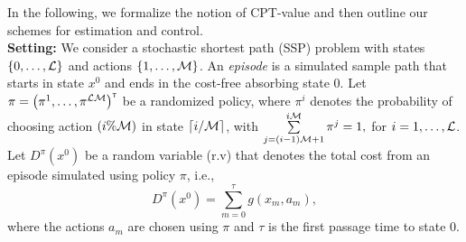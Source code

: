 \documentclass[11pt,letterpaper,english]{article}
\begin{document}
In the following, we formalize the notion of CPT-value and then outline our schemes for estimation and control.\\
\noindent\textbf{Setting:}
We consider a stochastic shortest path (SSP) problem with states $\{0,\ldots,\mathcal{L}\}$ and actions $\{1,\ldots,\mathcal{M}\}$. 
An \textit{episode} is a simulated sample path that starts in state $x^0$ and ends in the cost-free absorbing state $0$. 
Let $\pi=\left(\pi^{1},\ldots,\pi^{\mathcal{L}\mathcal{M}}\right)^\mathsf{\scriptscriptstyle T}$ be a randomized policy, where $\pi^{i}$ denotes the probability of choosing action $(i\% \mathcal{M})$ in state $\left \lceil{i/\mathcal{M}}\right \rceil$, with $\sum\limits_{j=(i-1)\mathcal{M}+1}^{i\mathcal{M}} \pi^{j} = 1,$ for $i=1,\ldots,\mathcal{L}$. 
Let $D^\pi(x^0)$ be a random variable (r.v) that denotes the total cost from an episode simulated using policy $\pi$, i.e.,
$$ D^\pi(x^0) = \sum\limits_{m=0}^{\tau} g(x_m,a_m), $$
where the actions $a_m$ are chosen using  $\pi$ and
$\tau$ is the first passage time to state $0$. 
\end{document}
